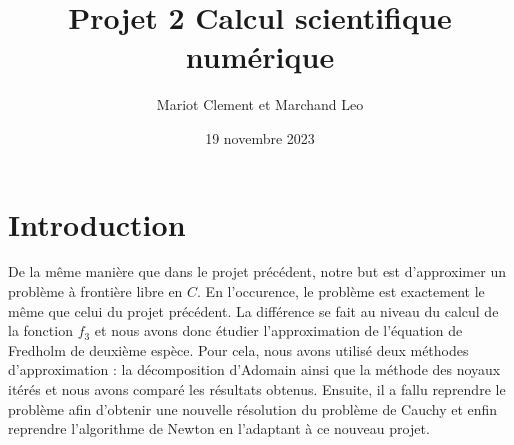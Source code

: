 \documentclass{article}
\title{Projet 2 Calcul scientifique numérique}
\author{Mariot Clement et Marchand Leo}
\date{19 novembre 2023}
\begin{document}
\maketitle

\section{Introduction}
    De la même manière que dans le projet précédent, notre but est d'approximer un problème à frontière libre en $C$. En l'occurence, le problème est exactement le même que celui du projet précédent. La
    différence se fait au niveau du calcul de la fonction $f_3$ et nous avons donc étudier l'approximation de l'équation de Fredholm de deuxième espèce. Pour cela, nous avons utilisé deux méthodes d'approximation : la décomposition d'Adomain ainsi que la méthode des noyaux itérés et nous avons comparé les résultats obtenus. Ensuite, il a fallu reprendre le problème afin d'obtenir une nouvelle résolution du problème de Cauchy et enfin reprendre l'algorithme de Newton en l'adaptant à ce nouveau projet.
\end{document}
